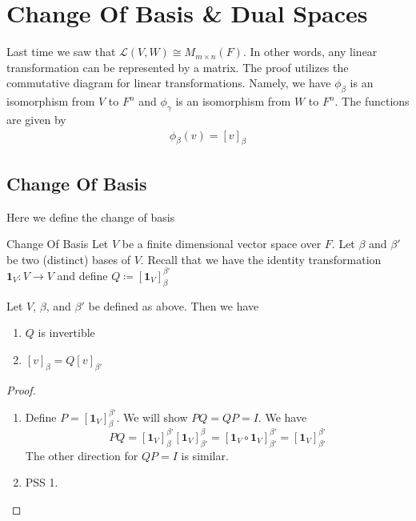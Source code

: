 \documentclass[main.tex]{subfiles}
\begin{document}
    \chapter{Change Of Basis \& Dual Spaces}

    Last time we saw that $\mathcal{L}(V, W) \cong M_{m\times n}(F)$. In other words, any linear transformation can be represented by a matrix. The proof utilizes the commutative diagram for linear transformations. Namely, we have $\phi_\beta$ is an isomorphism from $V$ to $F^n$ and $\phi_\gamma$ is an isomorphism from $W$ to $F^n$. The functions are given by 
    \begin{gather*}
        \phi_\beta (v) = [v]_\beta 
    \end{gather*}

    \section{Change Of Basis}
    Here we define the change of basis
    \begin{defn}{Change Of Basis}{}
        Let $V$ be a finite dimensional vector space over $F$. Let $\beta$ and $\beta'$ be two (distinct) bases of $V$. Recall that we have the identity transformation $\mathbf{1}_V : V\to V$ and define $Q \coloneqq [\mathbf{1}_{V}]_{\beta}^{\beta'}$
    \end{defn}

    \begin{thrm}{}{}
        Let $V$, $\beta$, and $\beta'$ be defined as above. Then we have 
        \begin{enumerate}
            \item $Q$ is invertible 
            \item $[v]_\beta = Q[v]_{\beta'}$
        \end{enumerate}
    \end{thrm}
    \begin{proof}
        \begin{enumerate}
            \item Define $P = [\mathbf{1}_V]_\beta^{\beta'}$. We will show $PQ = QP = I$. We have 
            \begin{equation*}
                PQ = [\mathbf{1}_V]_\beta^{\beta'} [\mathbf{1}_V]_{\beta'}^\beta = [\mathbf{1}_V \circ \mathbf{1}_V]_{\beta'}^{\beta'} = [\mathbf{1}_V]_{\beta'}^{\beta'}
            \end{equation*}
            The other direction for $QP = I$ is similar. 

            \item PSS 1. 
        \end{enumerate}
    \end{proof}
\end{document}
